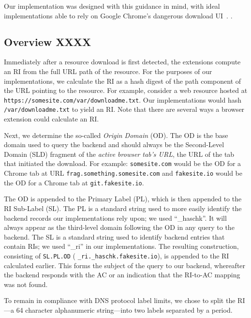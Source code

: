 Our implementation was designed with this guidance in mind, with ideal
implementations able to rely on Google Chrome's dangerous download
UI~\cite{ChromeClickThrough}. .

\subsection{Overview XXXX}

Immediately after a resource download is first detected, the extensions compute
an RI from the full URL path of the resource. For the purposes of our
implementations, we calculate the RI as a hash digest of the path component of
the URL pointing to the resource. For example, consider a web resource hosted at
\texttt{https://somesite.com/var/downloadme.txt}. Our implementations would hash
\texttt{/var/downloadme.txt} to yield an RI. Note that there are several ways a
browser extension could calculate an RI.

Next, we determine the so-called \emph{Origin Domain} (OD). The OD is the base
domain used to query the backend and should always be the Second-Level Domain
(SLD) fragment of the \emph{active browser tab's URL}, \ie the URL of the tab
that initiated the download. For example: \texttt{somesite.com} would be the OD
for a Chrome tab at URL \texttt{frag.something.somesite.com} and
\texttt{fakesite.io} would be the OD for a Chrome tab at
\texttt{git.fakesite.io}.

The OD is appended to the Primary Label (PL), which is then appended to the RI
Sub-Label (SL). The PL is a standard string used to more easily identify the
backend records our implementations rely upon; we used ``\_haschk''. It will
always appear as the third-level domain following the OD in any query to the
backend. The SL is a standard string used to identify backend entries that
contain RIs; we used ``\_ri'' in our implementations. The resulting
construction, consisting of \texttt{SL.PL.OD} (\eg
\texttt{\_ri.\_haschk.fakesite.io}), is appended to the RI calculated earlier.
This forms the subject of the query to our backend, whereafter the backend
responds with the AC or an indication that the RI-to-AC mapping was not found.

To remain in compliance with DNS protocol label limits, we chose to split the
RI---a 64 character alphanumeric string---into two labels separated by a period.

